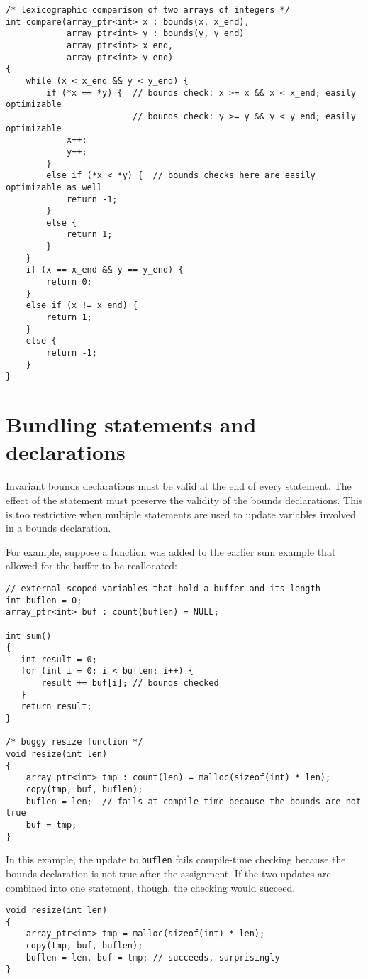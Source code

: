 \begin{verbatim}
/* lexicographic comparison of two arrays of integers */
int compare(array_ptr<int> x : bounds(x, x_end), 
            array_ptr<int> y : bounds(y, y_end)
            array_ptr<int> x_end,
            array_ptr<int> y_end)
{ 
    while (x < x_end && y < y_end) {
        if (*x == *y) {  // bounds check: x >= x && x < x_end; easily optimizable
                         // bounds check: y >= y && y < y_end; easily optimizable
            x++;
            y++;
        }
        else if (*x < *y) {  // bounds checks here are easily optimizable as well
            return -1;
        }
        else {
            return 1;
        }
    }
    if (x == x_end && y == y_end) {
        return 0;
    }
    else if (x != x_end) {
        return 1;
    }
    else {
        return -1; 
    }
}
\end{verbatim}

\section{Bundling statements and declarations}

Invariant bounds declarations must be valid at the end of every
statement. The effect of the statement must preserve the validity of the
bounds declarations. This is too restrictive when multiple statements
are used to update variables involved in a bounds declaration.

For example, suppose a function was added to the earlier sum example
that allowed for the buffer to be reallocated:
\begin{verbatim}
// external-scoped variables that hold a buffer and its length
int buflen = 0;
array_ptr<int> buf : count(buflen) = NULL;

int sum()
{
   int result = 0;
   for (int i = 0; i < buflen; i++) {
       result += buf[i]; // bounds checked
   }
   return result;
}

/* buggy resize function */
void resize(int len) 
{
    array_ptr<int> tmp : count(len) = malloc(sizeof(int) * len);
    copy(tmp, buf, buflen);
    buflen = len;  // fails at compile-time because the bounds are not true
    buf = tmp;
}
\end{verbatim}
In this example, the update to \texttt{buflen} fails compile-time
checking because the bounds declaration is not true after the
assignment. If the two updates are combined into one statement, though,
the checking would succeed.

\begin{verbatim}
void resize(int len) 
{
    array_ptr<int> tmp = malloc(sizeof(int) * len);
    copy(tmp, buf, buflen);
    buflen = len, buf = tmp; // succeeds, surprisingly
}
\end{verbatim}

